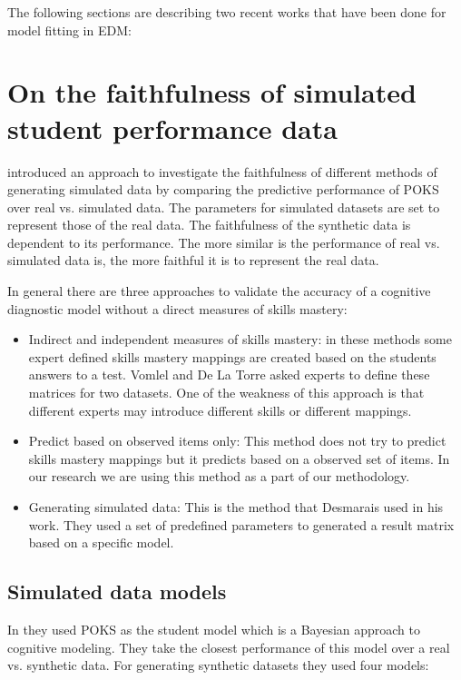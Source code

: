 The following sections are describing two recent works that have been done for model fitting in EDM:


\section{On the faithfulness of simulated student performance data}

\citet{Desmarais2010} introduced an approach to investigate the faithfulness of different methods of generating simulated data by comparing the predictive performance of POKS over real vs. simulated data. The parameters for simulated datasets are set to represent those of the real data. The faithfulness of the synthetic data is dependent to its performance. The more similar is the performance of real vs. simulated data is, the more faithful it is to represent the real data.

In general there are three approaches to validate the accuracy of a cognitive diagnostic model without a direct measures of skills mastery:

\begin{itemize}
\item Indirect and independent measures of skills mastery: in these methods some expert defined skills mastery mappings are created based on the students answers to a test. Vomlel \citep{vomlel:2004} and De La Torre \citep{delaTorre2008} asked experts to define these matrices for two datasets. One of the weakness of this approach is that different experts may introduce different skills or different mappings.

\item Predict based on observed items only: This method does not try to predict skills mastery mappings but it predicts based on a observed set of items. In our research we are using this method as a part of our methodology.

\item Generating simulated data: This is the method that Desmarais \citep{Desmarais2010} used in his work. They used a set of predefined parameters to generated a result matrix based on a specific model.

\end{itemize}
\subsection{Simulated data models}

In \citep{Desmarais2010} they used POKS as the student model which is a Bayesian approach to cognitive modeling. They take the closest performance of this model over a real vs. synthetic data. For generating synthetic datasets they used four models:

